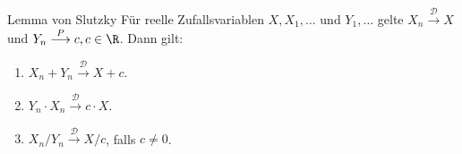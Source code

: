 \begin{karte}{Lemma von Slutzky}
Für reelle Zufallsvariablen \(X, X_1, \ldots\) und \(Y_1, \ldots\) gelte \(X_n \overset{\mathcal{D}}{\longrightarrow} X\) und \(Y_n \overset{P}{\longrightarrow} c, c\in \R\). 
Dann gilt: 
\begin{enumerate}
    \item \(X_n + Y_n \overset{\mathcal{D}}{\longrightarrow} X+c\).
    \item \(Y_n \cdot X_n \overset{\mathcal{D}}{\longrightarrow} c\cdot X\).
    \item \(X_n / Y_n \overset{\mathcal{D}}{\longrightarrow} X/c\), falls \(c\neq 0\).
\end{enumerate}
\end{karte}